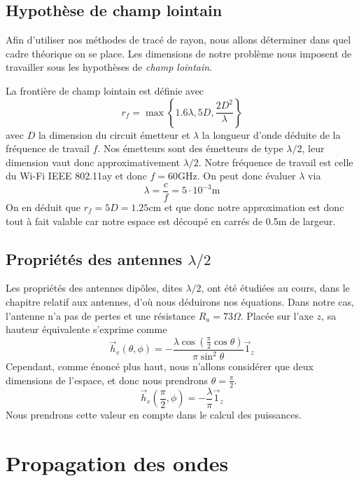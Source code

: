 \subsection{Hypoth{\`e}se de champ lointain}

Afin d'utiliser nos m{\'e}thodes de trac{\'e} de rayon, nous allons
d{\'e}terminer dans quel cadre th{\'e}orique on se place. Les dimensions de
notre probl{\`e}me nous imposent de travailler sous les hypoth{\`e}ses de
\textit{champ lointain}.

La fronti{\`e}re de champ lointain est d{\'e}finie avec
\[ r_f = \max \left\{ 1.6 \lambda, 5 D, \frac{2 D^2}{\lambda} \right\} \]
avec $D$ la dimension du circuit {\'e}metteur et $\lambda$ la longueur d'onde
d{\'e}duite de la fr{\'e}quence de travail $f$. Nos {\'e}metteurs sont des
{\'e}metteurs de type $\lambda / 2$, leur dimension vaut donc
approximativement $\lambda / 2$. Notre fr{\'e}quence de travail est celle du
Wi-Fi IEEE 802.11ay et donc $f = 60 \mathrm{GHz}$. On peut donc {\'e}valuer $\lambda$
via
\[ \lambda = \frac{c}{f} = 5 \cdot 10^{- 3} \mathrm{m} \]
On en d{\'e}duit que $r_f = 5 D = 1.25 \mathrm{cm}$ et que donc notre
approximation est donc tout {\`a} fait valable car notre espace est
d{\'e}coup{\'e} en carr{\'e}s de 0.5m de largeur.

\subsection{Propri{\'e}t{\'e}s des antennes $\lambda / 2$}

Les propri{\'e}t{\'e}s des antennes dip{\^o}les, dites $\lambda / 2$, ont
{\'e}t{\'e} {\'e}tudi{\'e}es au cours, dans le chapitre relatif aux antennes,
d'o{\`u} nous d{\'e}duirons nos {\'e}quations. Dans notre cas, l'antenne n'a pas de
pertes et une r{\'e}sistance $R_a = 73 \Omega$. Plac{\'e}e sur l'axe $z$, sa
hauteur {\'e}quivalente s'exprime comme
\[ \vec{h}_e (\theta, \phi) = - \frac{\lambda \cos \left( \frac{\pi}{2} \cos
   \theta \right)}{\pi \sin^2 \theta} \vec{1}_z \]
Cependant, comme {\'e}nonc{\'e} plus haut, nous n'allons consid{\'e}rer que
deux dimensions de l'espace, et donc nous prendrons $\theta = \frac{\pi}{2}$.
\[ \vec{h}_e \left( \frac{\pi}{2}, \phi \right) = - \frac{\lambda}{\pi}
   \vec{1}_z \]
Nous prendrons cette valeur en compte dans le calcul des puissances.

\section{Propagation des ondes}

